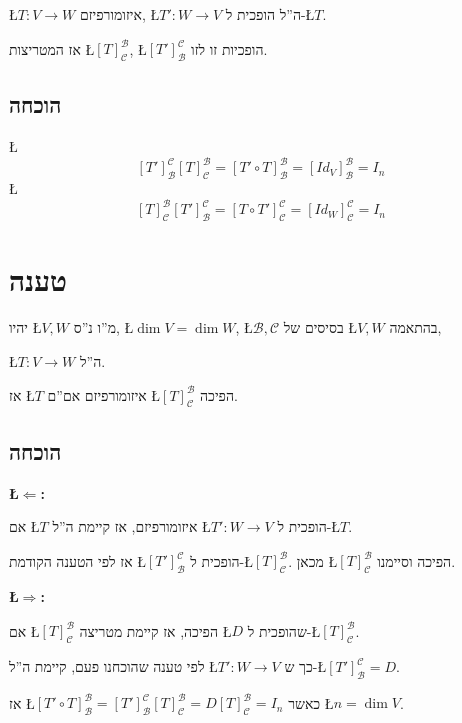 \documentclass[english,hebrew]{article}
\begin{document}
\L{$T:V\rightarrow W$} איזומורפיזם, \L{$T':W\rightarrow V$} ה\textquotedblright ל
הופכית ל-\L{$T$}.

אז המטריצות \L{$[T]_{\mathcal{C}}^{\mathcal{B}}$}, \L{$[T']_{\mathcal{B}}^{\mathcal{C}}$}
הופכיות זו לזו.

\subsection{הוכחה}

\L{%
\[
[T']_{\mathcal{B}}^{\mathcal{C}}[T]_{\mathcal{C}}^{\mathcal{B}}=[T'\circ T]_{\mathcal{B}}^{\mathcal{B}}=[Id_{V}]_{\mathcal{B}}^{\mathcal{B}}=I_{n}
\]
}%
\L{%
\[
[T]_{\mathcal{C}}^{\mathcal{B}}[T']_{\mathcal{B}}^{\mathcal{C}}=[T\circ T']_{\mathcal{C}}^{\mathcal{C}}=[Id_{W}]_{\mathcal{C}}^{\mathcal{C}}=I_{n}
\]
}%

\section{טענה}

יהיו \L{$V,W$} מ\textquotedblright ו נ\textquotedblright ס, \L{$\dim V=\dim W$},
\L{$\mathcal{B},\mathcal{C}$} בסיסים של \L{$V,W$} בהתאמה,

\L{$T:V\rightarrow W$} ה\textquotedblright ל.

אז \L{$T$} איזומורפיזם אם\textquotedblright ם \L{$[T]_{\mathcal{C}}^{\mathcal{B}}$}
הפיכה.

\subsection{הוכחה}

\textbf{\L{$\Leftarrow$}:}

אם \L{$T$} איזומורפיזם, אז קיימת ה\textquotedblright ל \L{$T':W\rightarrow V$}
הופכית ל-\L{$T$}.

אז לפי הטענה הקודמת \L{$[T']_{\mathcal{B}}^{\mathcal{C}}$} הופכית
ל-\L{$[T]_{\mathcal{C}}^{\mathcal{B}}$}. מכאן \L{$[T]_{\mathcal{C}}^{\mathcal{B}}$}
הפיכה וסיימנו.

\textbf{\L{$\Rightarrow$}:}

אם \L{$[T]_{\mathcal{C}}^{\mathcal{B}}$} הפיכה, אז קיימת מטריצה \L{$D$}
שהופכית ל-\L{$[T]_{\mathcal{C}}^{\mathcal{B}}$}.

לפי טענה שהוכחנו פעם, קיימת ה\textquotedblright ל \L{$T':W\rightarrow V$}
כך ש-\L{$[T']_{\mathcal{B}}^{\mathcal{C}}=D$}.

אז \L{$[T'\circ T]_{\mathcal{B}}^{\mathcal{B}}=[T']_{\mathcal{B}}^{\mathcal{C}}[T]_{\mathcal{C}}^{\mathcal{B}}=D[T]_{\mathcal{C}}^{\mathcal{B}}=I_{n}$}
כאשר \L{$n=\dim V$}.
\end{document}
